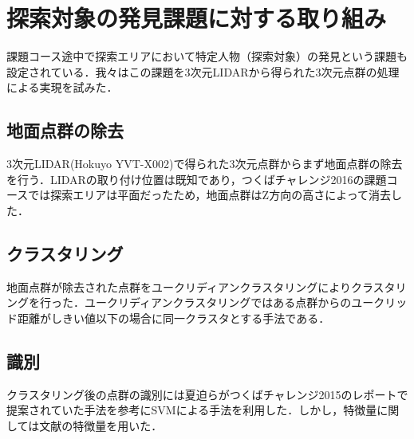 \documentclass[10pt,a4paper]{jarticle}
\begin{document}
\section{探索対象の発見課題に対する取り組み}
\label{200657_7Dec16}
課題コース途中で探索エリアにおいて特定人物（探索対象）の発見という課題も設定されている．我々はこの課題を3次元LIDARから得られた3次元点群の処理による実現を試みた．

\subsection{地面点群の除去}
3次元LIDAR(Hokuyo YVT-X002)で得られた3次元点群からまず地面点群の除去を行う．LIDARの取り付け位置は既知であり，つくばチャレンジ2016の課題コースでは探索エリアは平面だったため，地面点群はZ方向の高さによって消去した．
\subsection{クラスタリング}
地面点群が除去された点群をユークリディアンクラスタリングによりクラスタリングを行った．ユークリディアンクラスタリングではある点群からのユークリッド距離がしきい値以下の場合に同一クラスタとする手法である．
\subsection{識別}
クラスタリング後の点群の識別には夏迫ら\cite{chibainst2015}がつくばチャレンジ2015のレポートで提案されていた手法を参考にSVMによる手法を利用した．しかし，特徴量に関しては文献\cite{tokudome2016}の特徴量を用いた．
\end{document}
